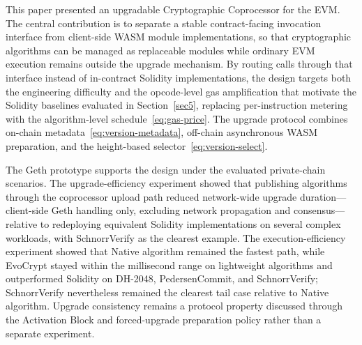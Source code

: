 \documentclass[pdflatex,sn-mathphys-num]{sn-jnl}%
\theoremstyle{thmstyleone}%
\theoremstyle{thmstyletwo}%
\theoremstyle{thmstylethree}%
\begin{document}
This paper presented an upgradable Cryptographic Coprocessor for the EVM. The central contribution is to separate a stable contract-facing invocation interface from client-side WASM module implementations, so that cryptographic algorithms can be managed as replaceable modules while ordinary EVM execution remains outside the upgrade mechanism. By routing calls through that interface instead of in-contract Solidity implementations, the design targets both the engineering difficulty and the opcode-level gas amplification that motivate the Solidity baselines evaluated in Section~\ref{sec5}, replacing per-instruction metering with the algorithm-level schedule~\eqref{eq:gas-price}. The upgrade protocol combines on-chain metadata~\eqref{eq:version-metadata}, off-chain asynchronous WASM preparation, and the height-based selector~\eqref{eq:version-select}.

The Geth prototype supports the design under the evaluated private-chain scenarios. The upgrade-efficiency experiment showed that publishing algorithms through the coprocessor upload path reduced network-wide upgrade duration---client-side Geth handling only, excluding network propagation and consensus---relative to redeploying equivalent Solidity implementations on several complex workloads, with SchnorrVerify as the clearest example. The execution-efficiency experiment showed that Native algorithm remained the fastest path, while EvoCrypt stayed within the millisecond range on lightweight algorithms and outperformed Solidity on DH-2048, PedersenCommit, and SchnorrVerify; SchnorrVerify nevertheless remained the clearest tail case relative to Native algorithm. Upgrade consistency remains a protocol property discussed through the Activation Block and forced-upgrade preparation policy rather than a separate experiment.
\end{document}
